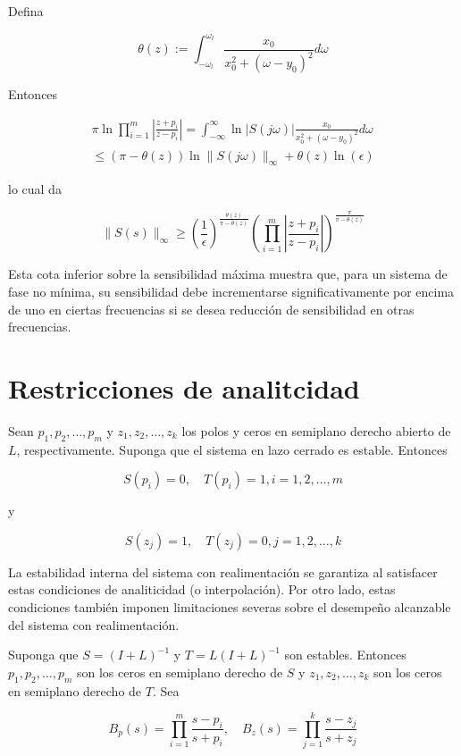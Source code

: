 Defina

$$
\theta(z):=\int_{-\omega_{l}}^{\omega_{l}} \frac{x_{0}}{x_{0}^{2}+\left(\omega-y_{0}\right)^{2}} d \omega
$$

Entonces

$$
\begin{gathered}
\pi \ln \prod_{i=1}^{m}\left|\frac{z+p_{i}}{z-p_{i}}\right|=\int_{-\infty}^{\infty} \ln |S(j \omega)| \frac{x_{0}}{x_{0}^{2}+\left(\omega-y_{0}\right)^{2}} d \omega \\
\leq(\pi-\theta(z)) \ln \|S(j \omega)\|_{\infty}+\theta(z) \ln (\epsilon)
\end{gathered}
$$

lo cual da

$$
\|S(s)\|_{\infty} \geq\left(\frac{1}{\epsilon}\right)^{\frac{\theta(z)}{\pi-\theta(z)}}\left(\prod_{i=1}^{m}\left|\frac{z+p_{i}}{z-p_{i}}\right|\right)^{\frac{\pi}{\pi-\theta(z)}}
$$

Esta cota inferior sobre la sensibilidad máxima muestra que, para un sistema de fase no mínima, su sensibilidad debe incrementarse significativamente por encima de uno en ciertas frecuencias si se desea reducción de sensibilidad en otras frecuencias.

\section{Restricciones de analitcidad}
Sean $p_{1}, p_{2}, \ldots, p_{m}$ y $z_{1}, z_{2}, \ldots, z_{k}$ los polos y ceros en semiplano derecho abierto de $L$, respectivamente. Suponga que el sistema en lazo cerrado es estable. Entonces

$$
S\left(p_{i}\right)=0, \quad T\left(p_{i}\right)=1, i=1,2, \ldots, m
$$

y

$$
S\left(z_{j}\right)=1, \quad T\left(z_{j}\right)=0, j=1,2, \ldots, k
$$

La estabilidad interna del sistema con realimentación se garantiza al satisfacer estas condiciones de analiticidad (o interpolación). Por otro lado, estas condiciones también imponen limitaciones severas sobre el desempeño alcanzable del sistema con realimentación.

Suponga que $S=(I+L)^{-1}$ y $T=L(I+L)^{-1}$ son estables. Entonces $p_{1}, p_{2}, \ldots, p_{m}$ son los ceros en semiplano derecho de $S$ y $z_{1}, z_{2}, \ldots, z_{k}$ son los ceros en semiplano derecho de $T$. Sea

$$
B_{p}(s)=\prod_{i=1}^{m} \frac{s-p_{i}}{s+p_{i}}, \quad B_{z}(s)=\prod_{j=1}^{k} \frac{s-z_{j}}{s+z_{j}}
$$


